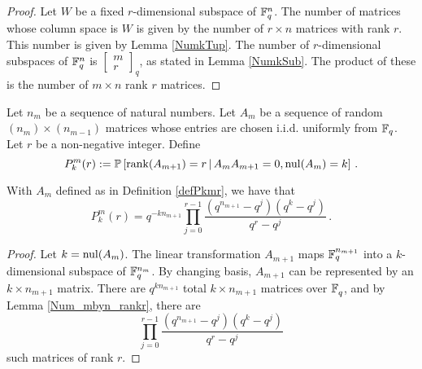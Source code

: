 \begin{proof}
  Let $W$ be a fixed $r$-dimensional subspace of $\mathbb{F}_q^{n}$.  The number of
  matrices whose column space is $W$ is given by the number of $r\times n$
  matrices with rank $r$.  This number is given by Lemma \ref{NumkTup}. The
  number of $r$-dimensional subspaces of $\mathbb{F}_q^{n}$ is
  $\left[\begin{smallmatrix}m\\r\end{smallmatrix}\right]_q$,  as stated in
  Lemma \ref{NumkSub}.  The product of these is the number of $m\times n$
  rank $r$ matrices.
\end{proof}


\begin{definition}\label{defPkmr}
Let $n_m$ be a sequence of natural numbers. Let $A_m$ be a sequence of random
$(n_m) \times (n_{m-1})$ matrices whose entries are chosen i.i.d. uniformly
from $\mathbb{F}_q$. Let $r$ be a non-negative integer.  Define 
\[
  P^m_k(r) := \mathbb{P} 
  \left[\operatorname{\mathrm{rank}}(A_{m+1}) = r \,|\, A_{m}A_{m+1} = 0, \mathrm{nul}(A_{m}) = k \right] \, .
\]
\end{definition}


\begin{lemma}\label{lemPkmr} With $A_m$ defined as in Definition \ref{defPkmr}, we have that
  \begin{equation}
    P^m_k(r) = 
    q^{-kn_{m+1}}\prod_{j=0}^{r-1} \frac{(q^{n_{m+1}}-q^j) (q^k - q^j)}{q^r - q^j} \, . %
	 \label{eqn:Pmkr}
       \end{equation}
\end{lemma}
\begin{proof}
  Let $ k = \mathrm{nul}(A_m)$.
The linear transformation $A_{m+1}$ maps 
$\mathbb{F}_q^{n_{m+1}}$ into a $k$-dimensional subspace of
$\mathbb{F}_q^{n_{m}}$. By changing basis, $A_{m+1}$ can be represented by an
$k \times n_{m+1}$ matrix. There are $q^{kn_{m+1}}$ total $k \times n_{m+1}$
matrices over $\mathbb{F}_q^{}$, and by
Lemma \ref{Num_mbyn_rankr}, there are 
\[
  \prod_{j=0}^{r-1} \frac{(q^{n_{m+1}}-q^j) ( q^k - q^j)}{q^r-q^j}
\]
such matrices of rank $r$.
\end{proof}


